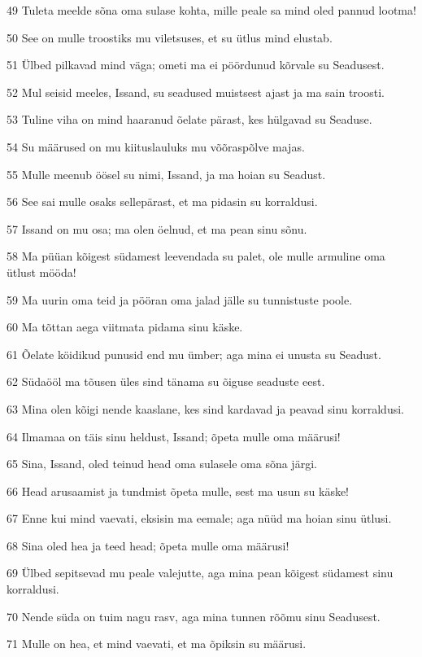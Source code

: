 \par 49 Tuleta meelde sõna oma sulase kohta, mille peale sa mind oled pannud lootma!
\par 50 See on mulle troostiks mu viletsuses, et su ütlus mind elustab.
\par 51 Ülbed pilkavad mind väga; ometi ma ei pöördunud kõrvale su Seadusest.
\par 52 Mul seisid meeles, Issand, su seadused muistsest ajast ja ma sain troosti.
\par 53 Tuline viha on mind haaranud õelate pärast, kes hülgavad su Seaduse.
\par 54 Su määrused on mu kiituslauluks mu võõraspõlve majas.
\par 55 Mulle meenub öösel su nimi, Issand, ja ma hoian su Seadust.
\par 56 See sai mulle osaks sellepärast, et ma pidasin su korraldusi.
\par 57 Issand on mu osa; ma olen öelnud, et ma pean sinu sõnu.
\par 58 Ma püüan kõigest südamest leevendada su palet, ole mulle armuline oma ütlust mööda!
\par 59 Ma uurin oma teid ja pööran oma jalad jälle su tunnistuste poole.
\par 60 Ma tõttan aega viitmata pidama sinu käske.
\par 61 Õelate köidikud punusid end mu ümber; aga mina ei unusta su Seadust.
\par 62 Südaööl ma tõusen üles sind tänama su õiguse seaduste eest.
\par 63 Mina olen kõigi nende kaaslane, kes sind kardavad ja peavad sinu korraldusi.
\par 64 Ilmamaa on täis sinu heldust, Issand; õpeta mulle oma määrusi!
\par 65 Sina, Issand, oled teinud head oma sulasele oma sõna järgi.
\par 66 Head arusaamist ja tundmist õpeta mulle, sest ma usun su käske!
\par 67 Enne kui mind vaevati, eksisin ma eemale; aga nüüd ma hoian sinu ütlusi.
\par 68 Sina oled hea ja teed head; õpeta mulle oma määrusi!
\par 69 Ülbed sepitsevad mu peale valejutte, aga mina pean kõigest südamest sinu korraldusi.
\par 70 Nende süda on tuim nagu rasv, aga mina tunnen rõõmu sinu Seadusest.
\par 71 Mulle on hea, et mind vaevati, et ma õpiksin su määrusi.
